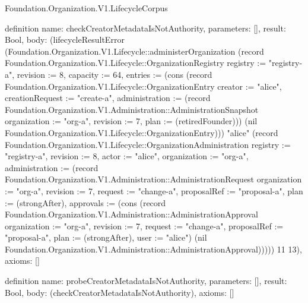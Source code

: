 \begin{lexlean}{Foundation.Organization.V1.LifecycleCorpus}
\begin{semanticmodule}
definition{
  name: checkCreatorMetadataIsNotAuthority,
  parameters: [],
  result: Bool,
  body: (lifecycleResultError (Foundation.Organization.V1.Lifecycle::administerOrganization (record Foundation.Organization.V1.Lifecycle::OrganizationRegistry {registry := "registry-a", revision := 8, capacity := 64, entries := (cons (record Foundation.Organization.V1.Lifecycle::OrganizationEntry {creator := "alice", creationRequest := "create-a", administration := (record Foundation.Organization.V1.Administration::AdministrationSnapshot {organization := "org-a", revision := 7, plan := (retiredFounder)})}) (nil Foundation.Organization.V1.Lifecycle::OrganizationEntry))}) "alice" (record Foundation.Organization.V1.Lifecycle::OrganizationAdministration {registry := "registry-a", revision := 8, actor := "alice", organization := "org-a", administration := (record Foundation.Organization.V1.Administration::AdministrationRequest {organization := "org-a", revision := 7, request := "change-a", proposalRef := "proposal-a", plan := (strongAfter), approvals := (cons (record Foundation.Organization.V1.Administration::AdministrationApproval {organization := "org-a", revision := 7, request := "change-a", proposalRef := "proposal-a", plan := (strongAfter), user := "alice"}) (nil Foundation.Organization.V1.Administration::AdministrationApproval))})})) 11 13),
  axioms: []
}

definition{
  name: probeCreatorMetadataIsNotAuthority,
  parameters: [],
  result: Bool,
  body: (checkCreatorMetadataIsNotAuthority),
  axioms: []
}


\end{semanticmodule}
\end{lexlean}
